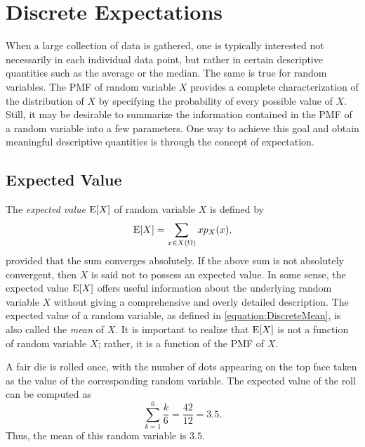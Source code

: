 \chapter{Discrete Expectations}
\label{chapter:ExpectationsDiscrete}

When a large collection of data is gathered, one is typically interested not necessarily in each individual data point, but rather in certain descriptive quantities such as the average or the median.
The same is true for random variables.
The PMF of random variable $X$ provides a complete characterization of the distribution of $X$ by specifying the probability of every possible value of $X$.
Still, it may be desirable to summarize the information contained in the PMF of a random variable into a few parameters.
One way to achieve this goal and obtain meaningful descriptive quantities is through the concept of expectation.


\section{Expected Value}

The \emph{expected value} $\mathrm{E} [X]$ of random variable $X$ is defined by 
\begin{equation} \label{equation:DiscreteMean}
\mathrm{E} [X] = \sum_{x \in X(\Omega)} x p_X (x) ,
\end{equation}
provided that the sum converges absolutely.
If the above sum is not absolutely convergent, then $X$ is said not to possess an expected value.
In some sense, the expected value $\mathrm{E} [X]$ offers useful information about the underlying random variable $X$ without giving a comprehensive and overly detailed description.
The expected value of a random variable, as defined in \eqref{equation:DiscreteMean}, is also called the \emph{mean} of $X$. 
It is important to realize that $\mathrm{E} [X]$ is not a function of random variable $X$; rather, it is a function of the PMF of $X$.

\begin{example}
A fair die is rolled once, with the number of dots appearing on the top face taken as the value of the corresponding random variable.
The expected value of the roll can be computed as
\begin{equation*}
\sum_{k=1}^6 \frac{k}{6} = \frac{42}{12} = 3.5 .
\end{equation*}
Thus, the mean of this random variable is $3.5$.
\end{example}


